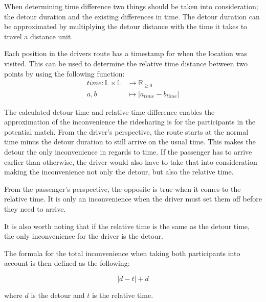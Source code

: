 When determining time difference two things should be taken into consideration; the detour duration and the existing differences in time.
The detour duration can be approximated by multiplying the detour distance with the time it takes to travel a distance unit.

Each position in the drivers route has a timestamp for when the location was visited.
This can be used to determine the relative time distance between two points by using the following function:
\begin{align*}
	time : \mathbb{L}\times\mathbb{L} &\rightarrow \mathbb{R}_{\geq 0}\\
	a, b &\mapsto | a_{time} - b_{time} |
\end{align*}

The calculated detour time and relative time difference enables the approximation of the inconvenience the ridesharing is for the participants in the potential match.
From the driver's perspective, the route starts at the normal time minus the detour duration to still arrive on the usual time.
This makes the detour the only inconvenience in regards to time.
If the passenger has to arrive earlier than otherwise, the driver would also have to take that into consideration making the inconvenience not only the detour, but also the relative time.

From the passenger's perspective, the opposite is true when it comes to the relative time. 
It is only an inconvenience when the driver must set them off before they need to arrive.

It is also worth noting that if the relative time is the same as the detour time, the only inconvenience for the driver is the detour.

The formula for the total inconvenience when taking both participants into account is then defined as the following:

\[ |d - t| + d \]

where $d$ is the detour and $t$ is the relative time.

\iffalse
Now, let us consider what would happen on the return route.
The situation is now that the driver and passenger want to return to their original locations, but they want to leave at a specific time.
The algorithm already solves this because if a specific arrival time is defined a specific departure time must also be defined.
And the differences in time must be the same.
\fi

